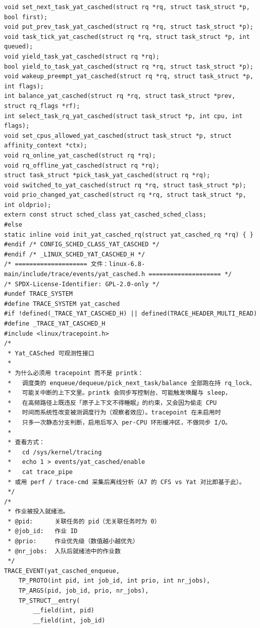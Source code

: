 \documentclass[10pt,a4paper]{article}
\newenvironment{yatpage}{\vspace*{0pt}}{\par}
\begin{document}
\newpage
\begin{yatpage}
\begin{Verbatim}[fontsize=\fontsize{8.2}{9.8}\selectfont]
void set_next_task_yat_casched(struct rq *rq, struct task_struct *p, bool first);
void put_prev_task_yat_casched(struct rq *rq, struct task_struct *p);
void task_tick_yat_casched(struct rq *rq, struct task_struct *p, int queued);
void yield_task_yat_casched(struct rq *rq);
bool yield_to_task_yat_casched(struct rq *rq, struct task_struct *p);
void wakeup_preempt_yat_casched(struct rq *rq, struct task_struct *p, int flags);
int balance_yat_casched(struct rq *rq, struct task_struct *prev, struct rq_flags *rf);
int select_task_rq_yat_casched(struct task_struct *p, int cpu, int flags);
void set_cpus_allowed_yat_casched(struct task_struct *p, struct affinity_context *ctx);
void rq_online_yat_casched(struct rq *rq);
void rq_offline_yat_casched(struct rq *rq);
struct task_struct *pick_task_yat_casched(struct rq *rq);
void switched_to_yat_casched(struct rq *rq, struct task_struct *p);
void prio_changed_yat_casched(struct rq *rq, struct task_struct *p, int oldprio);
extern const struct sched_class yat_casched_sched_class;
#else
static inline void init_yat_casched_rq(struct yat_casched_rq *rq) { }
#endif /* CONFIG_SCHED_CLASS_YAT_CASCHED */
#endif /* _LINUX_SCHED_YAT_CASCHED_H */
/* ==================== 文件：linux-6.8-main/include/trace/events/yat_casched.h ==================== */
/* SPDX-License-Identifier: GPL-2.0-only */
#undef TRACE_SYSTEM
#define TRACE_SYSTEM yat_casched
#if !defined(_TRACE_YAT_CASCHED_H) || defined(TRACE_HEADER_MULTI_READ)
#define _TRACE_YAT_CASCHED_H
#include <linux/tracepoint.h>
/*
 * Yat_CASched 可观测性接口
 *
 * 为什么必须用 tracepoint 而不是 printk：
 *   调度类的 enqueue/dequeue/pick_next_task/balance 全部跑在持 rq_lock、
 *   可能关中断的上下文里。printk 会同步写控制台、可能触发唤醒与 sleep，
 *   在高频路径上既违反「原子上下文不得睡眠」的约束，又会因为偷走 CPU
 *   时间而系统性改变被测调度行为（观察者效应）。tracepoint 在未启用时
 *   只多一次静态分支判断，启用后写入 per-CPU 环形缓冲区，不做同步 I/O。
 *
 * 查看方式：
 *   cd /sys/kernel/tracing
 *   echo 1 > events/yat_casched/enable
 *   cat trace_pipe
 * 或用 perf / trace-cmd 采集后离线分析（A7 的 CFS vs Yat 对比即基于此）。
 */
/*
 * 作业被投入就绪池。
 * @pid:      关联任务的 pid（无关联任务时为 0）
 * @job_id:   作业 ID
 * @prio:     作业优先级（数值越小越优先）
 * @nr_jobs:  入队后就绪池中的作业数
 */
TRACE_EVENT(yat_casched_enqueue,
	TP_PROTO(int pid, int job_id, int prio, int nr_jobs),
	TP_ARGS(pid, job_id, prio, nr_jobs),
	TP_STRUCT__entry(
		__field(int, pid)
		__field(int, job_id)
\end{Verbatim}
\end{yatpage}
\end{document}
